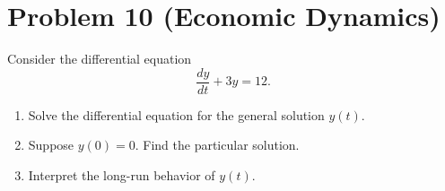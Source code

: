 \documentclass[12pt]{article}
\begin{document}
\section*{Problem 10 (Economic Dynamics)}

Consider the differential equation
\[
\frac{dy}{dt} + 3y = 12.
\]

\begin{enumerate}
    \item Solve the differential equation for the general solution \(y(t)\).
    \item Suppose \(y(0)=0\). Find the particular solution.
    \item Interpret the long-run behavior of \(y(t)\).
\end{enumerate}
\end{document}
